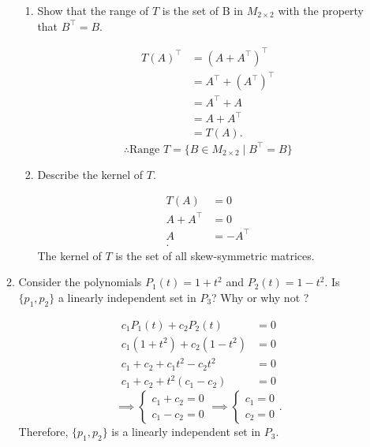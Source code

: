 \documentclass{zc-ust-hw}
\begin{document}
\begin{enumerate}
\begin{enumerate}
\begin{enumerate}
          \item Show that the range of $T$ is the set of B in $M_{2\times 2}$
            with the property that $B^\intercal=B$.
            \begin{sol}
              \begin{align}
                T(A)^\intercal &= (A+A^\intercal)^\intercal \\
                               &= A^\intercal + (A^\intercal)^\intercal \\
                               &= A^\intercal + A \\
                               &= A + A^\intercal \\
                               &= T(A)
              .\end{align}
              \begin{equation}
                \therefore \text{Range } T = \{B \in M_{2\times 2} \mid B^\intercal = B\}
              \end{equation}
            \end{sol}
            \newpage
          \item Describe the kernel of $T$.
            \begin{sol}
              \begin{align}
                T(A) &= 0 \\
                A + A^\intercal &= 0 \\
                A &= -A^\intercal \\
              .\end{align}
              The kernel of $T$ is the set of all skew-symmetric matrices.
            \end{sol}
        \end{enumerate}
      \item Consider the polynomials $P_1(t)=1+t^2$ and $P_2(t)=1-t^2$. Is
        $\{p_1,p_2\}$ a linearly independent set in $P_3$? Why or why not ? 
        \begin{sol}
          \begin{align}
            c_1P_1(t) + c_2P_2(t) &= 0 \\
            c_1(1+t^2) + c_2(1-t^2) &= 0 \\
            c_1 + c_2 + c_1t^2 - c_2t^2 &= 0 \\
            c_1 + c_2 + t^2(c_1 - c_2) &= 0
          \end{align}
          \begin{equation}
            \implies \begin{cases}
              c_1 + c_2 = 0 \\
              c_1 - c_2 = 0
            \end{cases}
            \implies \begin{cases}
              c_1 = 0 \\
              c_2 = 0
            \end{cases}
          .\end{equation}
          Therefore, $\{p_1,p_2\}$ is a linearly independent set in $P_3$.
        \end{sol}


\end{enumerate}
\end{enumerate}
\end{document}
